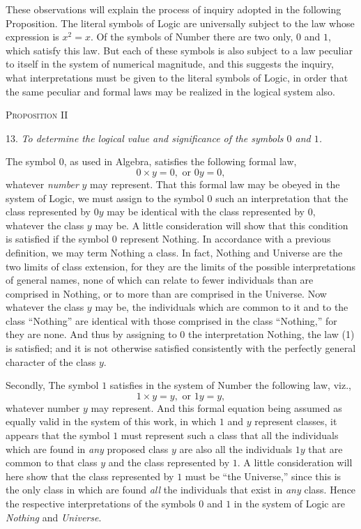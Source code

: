 \documentclass[oneside]{book}
\begin{document}
These observations will explain the process of inquiry adopted
in the following Proposition. The literal symbols of Logic are
universally subject to the law whose expression is $x^2 = x$. Of
the symbols of Number there are two only, $0$ and $1$, which satisfy
this law. But each of these symbols is also subject to a law
peculiar to itself in the system of numerical magnitude, and this
suggests the inquiry, what interpretations must be given to the
literal symbols of Logic, in order that the same peculiar and
formal laws may be realized in the logical system also.

\begin{center}
\textsc{Proposition II}
\end{center}
\setcounter{equation}{0}
13. \textit{To determine the logical value and significance of the
symbols $0$ and $1$.}

The symbol $0$, as used in Algebra, satisfies the following formal
law,
\begin{equation}
0 \times y = 0, \textrm{ or } 0y = 0,
\end{equation}
whatever \textit{number} $y$ may represent. That this formal law may be
obeyed in the system of Logic, we must assign to the symbol $0$
such an interpretation that the class represented by $0y$ may be
identical with the class represented by $0$, whatever the class $y$
may be. A little consideration will show that this condition is
satisfied if the symbol $0$ represent Nothing. In accordance with
a previous definition, we may term Nothing a class. In fact,
Nothing and Universe are the two limits of class extension, for
they are the limits of the possible interpretations of general
names, none of which can relate to fewer individuals than are
comprised in Nothing, or to more than are comprised in the
Universe. Now whatever the class $y$ may be, the individuals
which are common to it and to the class ``Nothing'' are identical
with those comprised in the class ``Nothing,'' for they are
none. And thus by assigning to $0$ the interpretation Nothing,
the law (1) is satisfied; and it is not otherwise satisfied
consistently with the perfectly general character of the class $y$.

Secondly, The symbol $1$ satisfies in the system of Number
the following law, viz.,
\[
1 \times y = y, \textrm{ or } 1y = y,
\]
whatever number $y$ may represent. And this formal equation
being assumed as equally valid in the system of this work, in
which $1$ and $y$ represent classes, it appears that the symbol $1$
must represent such a class that all the individuals which are
found in \textit{any} proposed class $y$ are also all the individuals $1y$ that
are common to that class $y$ and the class represented by $1$. A
little consideration will here show that the class represented by $1$
must be ``the Universe,'' since this is the only class in which
are found \textit{all} the individuals that exist in \textit{any} class. Hence the
respective interpretations of the symbols $0$ and $1$ in the system
of Logic are \textit{Nothing} and \textit{Universe}.
\end{document}
